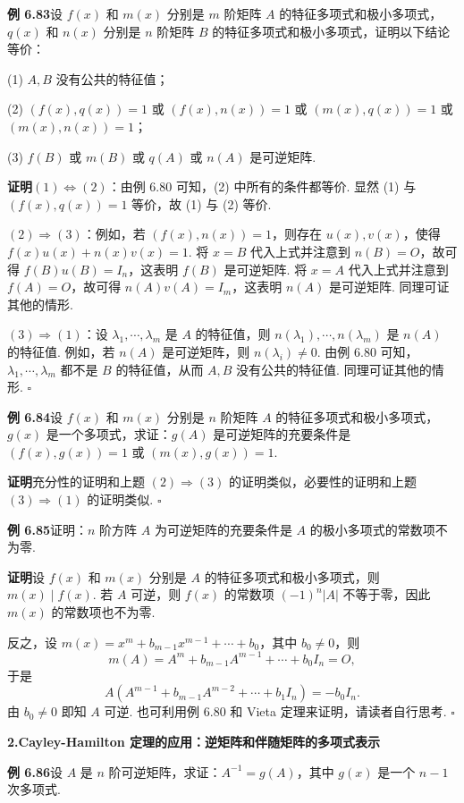 \documentclass[UTF8,12pt,a4paper,fontset=fandol]{ctexart}
\begin{document}
\noindent\textbf{例 6.83}\quad 设 $f(x)$ 和 $m(x)$ 分别是 $m$ 阶矩阵 $A$ 的特征多项式和极小多项式，$q(x)$ 和 $n(x)$ 分别是 $n$ 阶矩阵 $B$ 的特征多项式和极小多项式，证明以下结论等价：

(1) $A,B$ 没有公共的特征值；

(2) $(f(x),q(x))=1$ 或 $(f(x),n(x))=1$ 或 $(m(x),q(x))=1$ 或 $(m(x),n(x))=1$；

(3) $f(B)$ 或 $m(B)$ 或 $q(A)$ 或 $n(A)$ 是可逆矩阵.

\noindent\textbf{证明}\quad $(1)\Leftrightarrow(2)$：由例 6.80 可知，(2) 中所有的条件都等价. 显然 (1) 与 $(f(x),q(x))=1$ 等价，故 (1) 与 (2) 等价.

$(2)\Rightarrow(3)$：例如，若 $(f(x),n(x))=1$，则存在 $u(x),v(x)$，使得 $f(x)u(x)+n(x)v(x)=1$. 将 $x=B$ 代入上式并注意到 $n(B)=O$，故可得 $f(B)u(B)=I_n$，这表明 $f(B)$ 是可逆矩阵. 将 $x=A$ 代入上式并注意到 $f(A)=O$，故可得 $n(A)v(A)=I_m$，这表明 $n(A)$ 是可逆矩阵. 同理可证其他的情形.

$(3)\Rightarrow(1)$：设 $\lambda_1,\cdots,\lambda_m$ 是 $A$ 的特征值，则 $n(\lambda_1),\cdots,n(\lambda_m)$ 是 $n(A)$ 的特征值. 例如，若 $n(A)$ 是可逆矩阵，则 $n(\lambda_i)\ne 0$. 由例 6.80 可知，$\lambda_1,\cdots,\lambda_m$ 都不是 $B$ 的特征值，从而 $A,B$ 没有公共的特征值. 同理可证其他的情形. $\square$

\noindent\textbf{例 6.84}\quad 设 $f(x)$ 和 $m(x)$ 分别是 $n$ 阶矩阵 $A$ 的特征多项式和极小多项式，$g(x)$ 是一个多项式，求证：$g(A)$ 是可逆矩阵的充要条件是 $(f(x),g(x))=1$ 或 $(m(x),g(x))=1$.

\noindent\textbf{证明}\quad 充分性的证明和上题 $(2)\Rightarrow(3)$ 的证明类似，必要性的证明和上题 $(3)\Rightarrow(1)$ 的证明类似. $\square$

\noindent\textbf{例 6.85}\quad 证明：$n$ 阶方阵 $A$ 为可逆矩阵的充要条件是 $A$ 的极小多项式的常数项不为零.

\noindent\textbf{证明}\quad 设 $f(x)$ 和 $m(x)$ 分别是 $A$ 的特征多项式和极小多项式，则 $m(x)\mid f(x)$. 若 $A$ 可逆，则 $f(x)$ 的常数项 $(-1)^n|A|$ 不等于零，因此 $m(x)$ 的常数项也不为零.

反之，设 $m(x)=x^m+b_{m-1}x^{m-1}+\cdots+b_0$，其中 $b_0\ne 0$，则
\[
m(A)=A^m+b_{m-1}A^{m-1}+\cdots+b_0I_n=O,
\]
于是
\[
A(A^{m-1}+b_{m-1}A^{m-2}+\cdots+b_1I_n)=-b_0I_n.
\]
由 $b_0\ne 0$ 即知 $A$ 可逆. 也可利用例 6.80 和 Vieta 定理来证明，请读者自行思考. $\square$

\noindent\textbf{2.\quad Cayley-Hamilton 定理的应用：逆矩阵和伴随矩阵的多项式表示}

\noindent\textbf{例 6.86}\quad 设 $A$ 是 $n$ 阶可逆矩阵，求证：$A^{-1}=g(A)$，其中 $g(x)$ 是一个 $n-1$ 次多项式.
\end{document}
